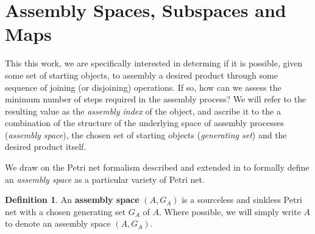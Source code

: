 \documentclass[aps,prd,onecolumn,nofootinbib,letterpaper,preprintnumbers,superscriptaddress,eqsecnum]{revtex4}
\theoremstyle{definition}
\newtheorem{definition}{Definition}
\begin{document}
\section{Assembly Spaces, Subspaces and Maps}\label{sec:assembly-spaces}

This this work, we are specifically interested in determing if it is possible, given some set of starting objects, to assembly a desired product through some sequence of joining (or disjoining) operations.
If so, how can we assess the minimum number of steps required in the assembly process?
We will refer to the resulting value as the \textit{assembly index} of the object, and ascribe it to the a combination of the structure of the underlying space of assembly processes (\textit{assembly space}), the chosen set of starting objects (\textit{generating set}) and the desired product itself.

We draw on the Petri net formalism described and extended in  to formally define an \textit{assembly space} as a particular variety of Petri net.

\begin{definition}\label{def:assembly-space}
    An \textbf{assembly space} $(A, G_A)$ is a sourceless and sinkless Petri net with a chosen generating set $G_A$ of $A$.
    Where possible, we will simply write $A$ to denote an assembly space $(A, G_A)$.
\end{definition}
\end{document}
